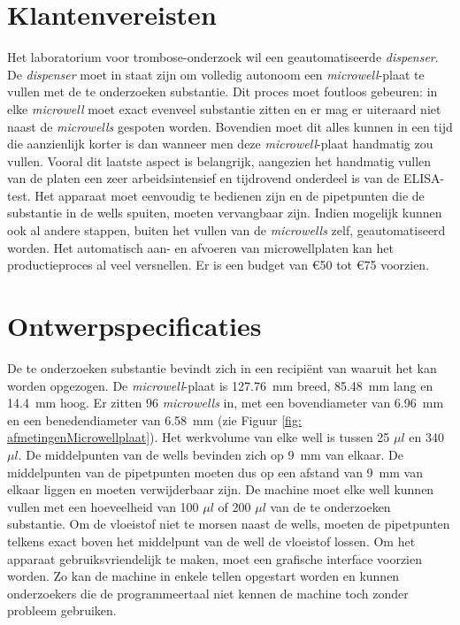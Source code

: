 \documentclass[a4paper,twoside,kulak]{kulakreport} %
\begin{document}
\chapter{Klantenvereisten}
Het laboratorium voor trombose-onderzoek wil een geautomatiseerde \textit{dispenser}. De \textit{dispenser} moet in staat zijn om volledig autonoom een \textit{microwell}-plaat te vullen met de te onderzoeken substantie. Dit proces moet foutloos gebeuren: in elke \textit{microwell} moet exact evenveel substantie zitten en er mag er uiteraard niet naast de \textit{microwells} gespoten worden. Bovendien moet dit alles kunnen in een tijd die aanzienlijk korter is dan wanneer men deze \textit{microwell}-plaat handmatig zou vullen. Vooral dit laatste aspect is belangrijk, aangezien het handmatig vullen van de platen een zeer arbeidsintensief en tijdrovend onderdeel is van de ELISA-test. Het apparaat moet eenvoudig te bedienen zijn en de pipetpunten die de substantie in de wells spuiten, moeten vervangbaar zijn.  Indien mogelijk kunnen ook al andere stappen, buiten het vullen van de \textit{microwells} zelf, geautomatiseerd worden. Het automatisch aan- en afvoeren van microwellplaten kan het productieproces al veel versnellen. Er is een budget van \euro 50 tot \euro 75 voorzien.
\chapter{Ontwerpspecificaties}
De te onderzoeken substantie bevindt zich in een recipiënt van waaruit het kan worden opgezogen. De \textit{microwell}-plaat is \SI{127.76}{mm} breed, \SI{85.48}{mm} lang en \SI{14.4}{mm} hoog. Er zitten 96 \textit{microwells} in, met een bovendiameter van \SI{6.96}{mm} en een benedendiameter van \SI{6.58}{mm} (zie Figuur \ref{fig: afmetingenMicrowellplaat}). Het werkvolume van elke well is tussen 25 $\mu l$ en 340 $\mu l$. De middelpunten van de wells bevinden zich op \SI{9}{mm} van elkaar. De middelpunten van de pipetpunten moeten dus op een afstand van \SI{9}{mm} van elkaar liggen en moeten verwijderbaar zijn. De machine moet elke well kunnen vullen met een hoeveelheid van 100 $\mu l$ of 200 $\mu l$ van de te onderzoeken substantie. Om de vloeistof niet te morsen naast de wells, moeten de pipetpunten telkens exact boven het middelpunt van de well de vloeistof lossen. Om het apparaat gebruiksvriendelijk te maken, moet een grafische interface voorzien worden. Zo kan de machine in enkele tellen opgestart worden en kunnen onderzoekers die de programmeertaal niet kennen de machine toch zonder probleem gebruiken.
\end{document}
